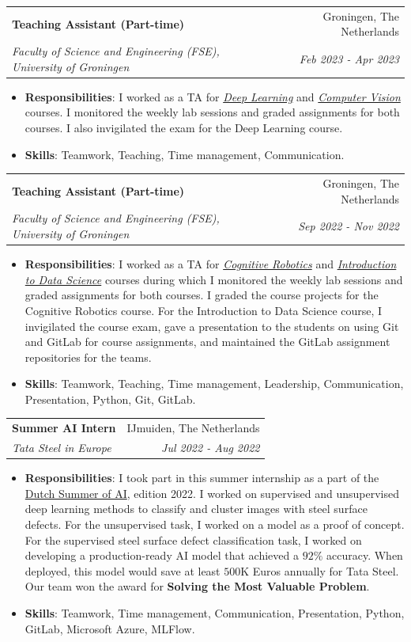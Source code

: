 \documentclass[letterpaper, 10pt]{article}
\makeatletter
\newcommand{\resumeItem}[2]{
    \item\small{
        \textbf{#1}{: #2 \vspace{-2pt}}
    }
}
\newcommand{\resumeSubheading}[4]{
    \vspace{-1pt}\item
    \begin{tabular*}{0.97\textwidth}{l@{\extracolsep{\fill}}r}
        \textbf{#1} & #2 \\
        \textit{\small#3} & \textit{\small #4} \\
    \end{tabular*}\vspace{-5pt}
}
\newcommand{\resumeSubHeadingListStart}{\begin{itemize}[leftmargin=*]}
\newcommand{\resumeSubHeadingListEnd}{\end{itemize}}
\makeatother
\begin{document}
        \resumeSubheading{Teaching Assistant (Part-time)}{Groningen, The Netherlands}{Faculty of Science and Engineering (FSE), University of Groningen}{Feb 2023 - Apr 2023}
            \resumeSubHeadingListStart
                \resumeItem{Responsibilities}{I worked as a TA for  \href{https://ocasys.rug.nl/current/catalog/course/WMAI017-05}{\textit{Deep Learning}} and \href{https://ocasys.rug.nl/current/catalog/course/WMCS015-05}{\textit{Computer Vision}} courses. I monitored the weekly lab sessions and graded assignments for both courses. I also invigilated the exam for the Deep Learning course.}
                \resumeItem{Skills}{Teamwork, Teaching, Time management, Communication.}
            \resumeSubHeadingListEnd
    
        \resumeSubheading{Teaching Assistant (Part-time)}{Groningen, The Netherlands}{Faculty of Science and Engineering (FSE), University of Groningen}{Sep 2022 - Nov 2022}
            \resumeSubHeadingListStart
                \resumeItem{Responsibilities}{I worked as a TA for  \href{https://www.rug.nl/ocasys/fwn/vak/show?code=WMAI003-05}{\textit{Cognitive Robotics}} and \href{https://www.rug.nl/ocasys/fwn/vak/show?code=WMCS002-05}{\textit{Introduction to Data Science}} courses during which I monitored the weekly lab sessions and graded assignments for both courses. I graded the course projects for the Cognitive Robotics course. For the Introduction to Data Science course, I invigilated the course exam, gave a presentation to the students on using Git and GitLab for course assignments, and maintained the GitLab assignment repositories for the teams.}
                \resumeItem{Skills}{Teamwork, Teaching, Time management, Leadership, Communication, Presentation, Python, Git, GitLab.}
            \resumeSubHeadingListEnd
    
        \resumeSubheading{Summer AI Intern}{IJmuiden, The Netherlands}{Tata Steel in Europe}{Jul 2022 - Aug 2022}
            \resumeSubHeadingListStart
                \resumeItem{Responsibilities}{I took part in this summer internship as a part of the \href{https://www.summerof.ai/}{Dutch Summer of AI}, edition 2022. I worked on supervised and unsupervised deep learning methods to classify and cluster images with steel surface defects. For the unsupervised task, I worked on a model as a proof of concept. For the supervised steel surface defect classification task, I worked on developing a production-ready AI model that achieved a $92\%$ accuracy. When deployed, this model would save at least $500$K Euros annually for Tata Steel. Our team won the award for \textbf{Solving the Most Valuable Problem}.}
                \resumeItem{Skills}{Teamwork, Time management, Communication, Presentation, Python, GitLab, Microsoft Azure, MLFlow.}
            \resumeSubHeadingListEnd
\end{document}
